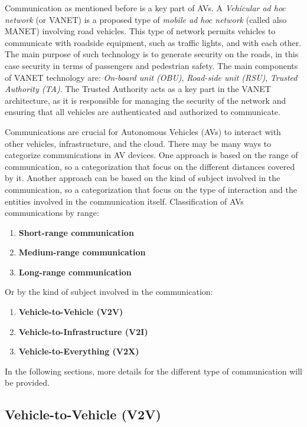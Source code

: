 Communication as mentioned before is a key part of AVs.
A \textit{Vehicular ad hoc network} (or VANET) is a proposed type of \textit{mobile ad hoc network} (called also MANET)
involving road vehicles.
This type of network permits vehicles to communicate with roadside equipment,
such as traffic lights, and with each other\cite{sheikh2019comprehensive}.
The main purpose of such technology is to generate security on the roads,
in this case security in terms of passengers and pedestrian safety.
The main components of VANET technology are: \textit{On-board unit (OBU)},
\textit{Road-side unit (RSU)}, \textit{Trusted Authority (TA)}.
The Trusted Authority acts as a key part in the VANET architecture,
as it is responsible for managing the security of the network and ensuring that all vehicles are authenticated
and authorized to communicate.

Communications are crucial for Autonomous Vehicles (AVs) to interact with other vehicles, infrastructure, and the cloud.
There may be many ways to categorize communications in AV devices.
One approach is based on the range of communication,
so a categorization that focus on the different distances covered by it.
Another approach can be based on the kind of subject involved in the communication,
so a categorization that focus on the type of interaction and the entities involved in the communication itself.
Classification of AVs communications by range:
\begin{enumerate}
    \item \textbf{Short-range communication}
    \item \textbf{Medium-range communication}
    \item \textbf{Long-range communication}
\end{enumerate}

Or by the kind of subject involved in the communication:
\begin{enumerate}
    \item \textbf{Vehicle-to-Vehicle (V2V)}
    \item \textbf{Vehicle-to-Infrastructure (V2I)}
    \item \textbf{Vehicle-to-Everything (V2X)}
\end{enumerate}

In the following sections, more details for the different type of communication will be provided.

\subsection{Vehicle-to-Vehicle (V2V)}\label{subsec:vehicle-to-vehicle-(v2v)}

